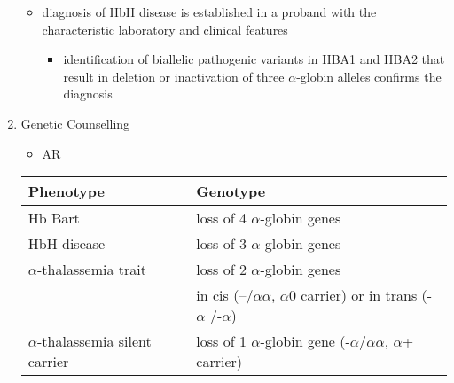 \documentclass[12pt]{scrartcl}
\begin{document}
\begin{enumerate}
\begin{itemize}
\begin{itemize}
\end{itemize}
\item diagnosis of HbH disease is established in a proband with the
characteristic laboratory and clinical features
\begin{itemize}
\item identification of biallelic pathogenic variants in HBA1 and HBA2
that result in deletion or inactivation of three \(\alpha\)-globin
alleles confirms the diagnosis
\end{itemize}
\end{itemize}
\item Genetic Counselling
\label{sec:orgdae2762}
\begin{itemize}
\item AR
\end{itemize}

\begin{center}
\begin{tabular}{ll}
Phenotype & Genotype\\
\hline
Hb Bart & loss of 4 \(\alpha\)-globin genes\\
HbH disease & loss of 3 \(\alpha\)-globin genes\\
\(\alpha\)-thalassemia trait & loss of 2 \(\alpha\)-globin genes\\
 & in cis (--/\(\alpha \alpha\), \(\alpha\)0 carrier) or in trans (-\(\alpha\) /-\(\alpha\))\\
\(\alpha\)-thalassemia silent carrier & loss of 1 \(\alpha\)-globin gene (-\(\alpha\)/\(\alpha \alpha\), \(\alpha\)+ carrier)\\
\end{tabular}
\end{center}
\end{enumerate}
\end{document}
